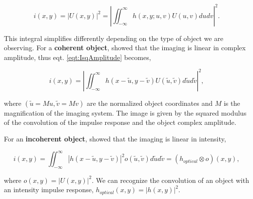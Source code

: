 \begin{equation}
i(x,y) = |U(x,y)|^2 = |\iint_{-\infty}^{\infty} h(x,y;u,v)U(u,v)dudv|^2.
\label{eqt:IsqAmplitude}
\end{equation}

This integral simplifies differently depending on the type of object we are observing. For a \textbf{coherent object}, \citet[Chapter 6.2]{goodman_1968} showed that the imaging is linear in complex amplitude, thus eqt. \eqref{eqt:IsqAmplitude} becomes,

\begin{equation}
i(x,y) = |\iint_{-\infty}^{\infty} h(x-\widetilde{u},y-\widetilde{v})U(\widetilde{u},\widetilde{v})d\widetilde{u}d\widetilde{v}|^2,
\label{eqt:convolution_hUo}
\end{equation}

where $(\widetilde{u} = Mu,\widetilde{v}= Mv)$ are the normalized object coordinates and $M$ is the magnification of the imaging system. The image is given by the squared modulus of the convolution of the impulse response and the object complex amplitude.

For an \textbf{incoherent object},  \citet[Chapter 6.2]{goodman_1968} showed that the imaging is linear in intensity,

\begin{equation}
i(x,y) = \iint_{-\infty}^{\infty}|h(x-\widetilde{u},y-\widetilde{v})|^2o(\widetilde{u},\widetilde{v})d\widetilde{u}d\widetilde{v} = (h_{optical}\otimes o)(x,y),
\label{eqt:imageObjectrel}
\end{equation}

where $o(x,y) = |U(x,y)|^2$. We can recognize the convolution of an object with an intensity impulse response, $h_{optical}(x,y) = |h(x,y)|^2$.

